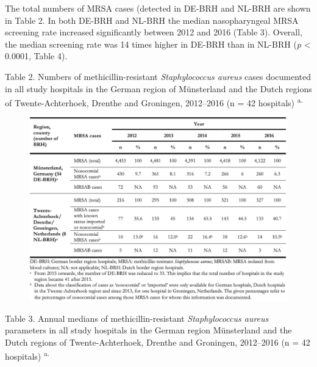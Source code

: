 \documentclass[
]{book}
\begin{document}
The total numbers of MRSA cases (detected in DE-BRH and NL-BRH are shown in Table 2. In both DE-BRH and NL-BRH the median nasopharyngeal MRSA screening rate increased significantly between 2012 and 2016 (Table 3). Overall, the median screening rate was 14 times higher in DE-BRH than in NL-BRH (\emph{p} \textless{} 0.0001, Table 4).

Table 2. Numbers of methicillin-resistant \emph{Staphylococcus aureus} cases documented in all study hospitals in the German region of Münsterland and the Dutch regions of Twente-Achterhoek, Drenthe and Groningen, 2012--2016 (n = 42 hospitals) \textsuperscript{a.}

\begin{figure}

{\centering \includegraphics[width=1\linewidth]{images/09-t02} 

}

\end{figure}

Table 3. Annual medians of methicillin-resistant \emph{Staphylococcus aureus} parameters in all study hospitals in the German region Münsterland and the Dutch regions of Twente-Achterhoek, Drenthe and Groningen, 2012--2016 (n = 42 hospitals) \textsuperscript{a.}
\end{document}
